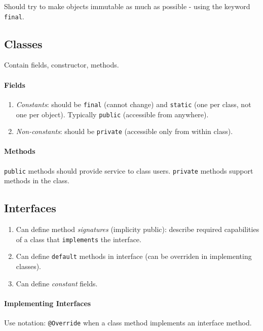 \documentclass[twocolumn,english]{article}
\begin{document}
Should try to make objects immutable as much as possible - using the
keyword \texttt{final}.


\subsection{Classes}

Contain fields, constructor, methods.


\paragraph{Fields}
\begin{enumerate}
\item \emph{Constants}: should be \texttt{final} (cannot change) and \texttt{static}
(one per class, not one per object). Typically \texttt{public} (accessible
from anywhere).
\item \emph{Non-constants}: should be \texttt{private} (accessible only
from within class).
\end{enumerate}

\paragraph{Methods}

\texttt{public} methods should provide service to class users. \texttt{private}
methods support methods in the class.


\subsection{Interfaces}
\begin{enumerate}
\item Can define method \emph{signatures} (implicity public): describe required
capabilities of a class that \texttt{implements}\emph{ }the interface.
\item Can define \texttt{default} methods in interface (can be overriden
in implementing classes).
\item Can define \emph{constant} fields.
\end{enumerate}

\paragraph{Implementing Interfaces}

Use notation: \texttt{@Override} when a class method implements an
interface method.
\end{document}
